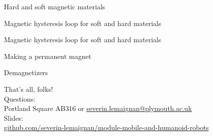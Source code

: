 \documentclass[compress]{beamer}
\begin{document}
{
    \begin{frame}{Hard and soft magnetic materials}
    \end{frame}
}

{
    \begin{frame}{Magnetic hysteresis loop for soft and hard materials}
    \end{frame}
}

{
    \begin{frame}{Magnetic hysteresis loop for soft and hard materials}
    \end{frame}
}

{
    \begin{frame}{Making a permanent magnet}
    \end{frame}
}


{
    \begin{frame}{Demagnetizers}
    \end{frame}
}


\begin{frame}{}
    \begin{center}
        \Large
        That's all, folks!\\[2em]
        \normalsize
        Questions:\\
        Portland Square AB316 or \url{severin.lemaignan@plymouth.ac.uk} \\[1em]

        Slides:\\ \href{https://github.com/severin-lemaignan/module-mobile-and-humanoid-robots}{\small github.com/severin-lemaignan/module-mobile-and-humanoid-robots}

    \end{center}
\end{frame}
\end{document}
